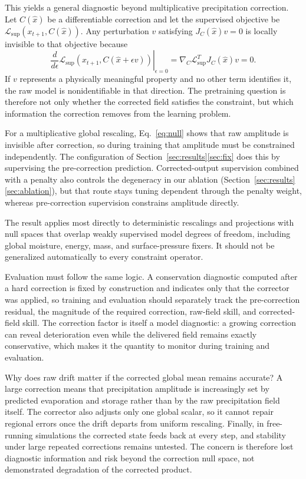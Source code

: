 \documentclass{ametsocV6.1}
\begin{document}
This yields a general diagnostic beyond multiplicative precipitation correction. Let $C(\hat x)$ be a differentiable correction and let the supervised objective be $\mathcal{L}_{\mathrm{sup}}(x_{t+1},C(\hat x))$. Any perturbation $v$ satisfying $J_C(\hat x)v=0$ is locally invisible to that objective because
\begin{equation}
\left.\frac{d}{d\epsilon}\mathcal{L}_{\mathrm{sup}}\!\left(x_{t+1},C(\hat x+\epsilon v)\right)\right|_{\epsilon=0}
=\nabla_C\mathcal{L}_{\mathrm{sup}}^{T}J_C(\hat x)v=0.
\label{eq:generalnull}
\end{equation}
If $v$ represents a physically meaningful property and no other term identifies it, the raw model is nonidentifiable in that direction. The pretraining question is therefore not only whether the corrected field satisfies the constraint, but which information the correction removes from the learning problem.

For a multiplicative global rescaling, Eq.~\eqref{eq:null} shows that raw amplitude is invisible after correction, so during training that amplitude must be constrained independently. The configuration of Section~\ref{sec:results}\ref{sec:fix} does this by supervising the pre-correction prediction. Corrected-output supervision combined with a penalty also controls the degeneracy in our ablation (Section~\ref{sec:results}\ref{sec:ablation}), but that route stays tuning dependent through the penalty weight, whereas pre-correction supervision constrains amplitude directly.

The result applies most directly to deterministic rescalings and projections with null spaces that overlap weakly supervised model degrees of freedom, including global moisture, energy, mass, and surface-pressure fixers. It should not be generalized automatically to every constraint operator.

Evaluation must follow the same logic. A conservation diagnostic computed after a hard correction is fixed by construction and indicates only that the corrector was applied, so training and evaluation should separately track the pre-correction residual, the magnitude of the required correction, raw-field skill, and corrected-field skill. The correction factor is itself a model diagnostic: a growing correction can reveal deterioration even while the delivered field remains exactly conservative, which makes it the quantity to monitor during training and evaluation.

Why does raw drift matter if the corrected global mean remains accurate?
A large correction means that precipitation amplitude is increasingly set
by predicted evaporation and storage rather than by the raw precipitation
field itself. The corrector also adjusts only one global scalar, so it cannot
repair regional errors once the drift departs from uniform rescaling.
Finally, in free-running simulations the corrected state feeds back at every
step, and stability under large repeated corrections remains untested. The
concern is therefore lost diagnostic information and risk beyond the
correction null space, not demonstrated degradation of the corrected
product.
\end{document}
